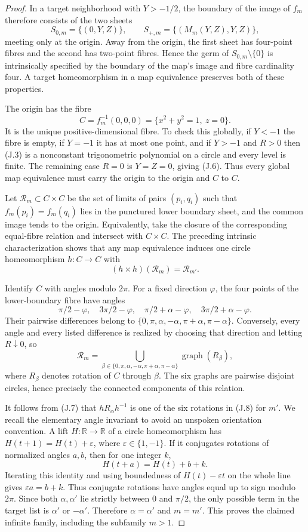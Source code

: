 \begin{proof}
In a target neighborhood with $Y>-1/2$, the boundary of the image of
$f_m$ therefore consists of the two sheets
\[
 S_{0,m}=\{(0,Y,Z)\},\qquad
 S_{+,m}=\{(M_m(Y,Z),Y,Z)\},
\tag{J.5}
\]
meeting only at the origin. Away from the origin, the first sheet has
four-point fibres and the second has two-point fibres. Hence the germ
of $S_{0,m}\setminus\{0\}$ is intrinsically specified by the boundary
of the map's image and fibre cardinality four. A target homeomorphism
in a map equivalence preserves both of these properties.

The origin has the fibre
\[
 C=f_m^{-1}(0,0,0)=\{x^2+y^2=1,\ z=0\}.
\tag{J.6}
\]
It is the unique positive-dimensional fibre. To check this globally,
if $Y<-1$ the fibre is empty, if $Y=-1$ it has at most one point,
and if $Y>-1$ and $R>0$ then (J.3) is a nonconstant trigonometric
polynomial on a circle and every level is finite. The remaining case
$R=0$ is $Y=Z=0$, giving (J.6). Thus every global map equivalence
must carry the origin to the origin and $C$ to $C$.

Let $\mathcal R_m\subset C\times C$ be the set of limits of pairs
$(p_i,q_i)$ such that $f_m(p_i)=f_m(q_i)$ lies in the punctured lower
boundary sheet, and the common image tends to the origin. Equivalently,
take the closure of the corresponding equal-fibre relation and intersect
with $C\times C$. The preceding intrinsic characterization shows that
any map equivalence induces one circle homeomorphism $h:C\to C$ with
\[
 (h\times h)(\mathcal R_m)=\mathcal R_{m'}.
\tag{J.7}
\]

Identify $C$ with angles modulo $2\pi$. For a fixed direction
$\varphi$, the four points of the lower-boundary fibre have angles
\[
 \pi/2-\varphi,\quad 3\pi/2-\varphi,\quad
 \pi/2+\alpha-\varphi,\quad 3\pi/2+\alpha-\varphi.
\]
Their pairwise differences belong to
$\{0,\pi,\alpha,-\alpha,\pi+\alpha,\pi-\alpha\}$.
Conversely, every angle and every listed difference is realized by
choosing that direction and letting $R\downarrow0$, so
\[
 \mathcal R_m=\bigcup_{\beta\in
 \{0,\pi,\alpha,-\alpha,\pi+\alpha,\pi-\alpha\}}
                  \operatorname{graph}(R_\beta),
\tag{J.8}
\]
where $R_\beta$ denotes rotation of $C$ through $\beta$.
The six graphs are pairwise disjoint circles, hence precisely the
connected components of this relation.

It follows from (J.7) that $hR_\alpha h^{-1}$ is one of the six
rotations in (J.8) for $m'$. We recall the elementary angle invariant
to avoid an unspoken orientation convention. A lift $H:\mathbb R\to
\mathbb R$ of a circle homeomorphism has
$H(t+1)=H(t)+\varepsilon$, where $\varepsilon\in\{1,-1\}$.
If it conjugates rotations of normalized angles $a,b$, then for one
integer $k$,
\[
 H(t+a)=H(t)+b+k.
\]
Iterating this identity and using boundedness of $H(t)-\varepsilon t$
on the whole line gives $\varepsilon a=b+k$. Thus conjugate rotations
have angles equal up to sign modulo $2\pi$. Since both
$\alpha,\alpha'$ lie strictly between $0$ and $\pi/2$, the only
possible term in the target list is $\alpha'$ or $-\alpha'$.
Therefore $\alpha=\alpha'$ and $m=m'$. This proves the claimed
infinite family, including the subfamily $m>1$.

\end{proof}

